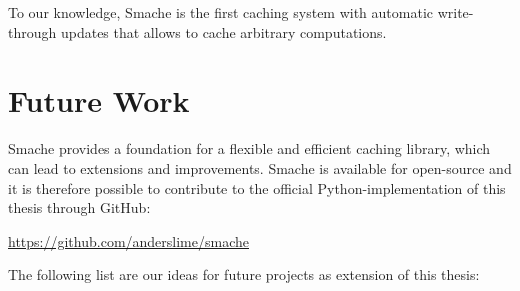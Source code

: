 To our knowledge, Smache is the first caching system with automatic write-through updates that allows to cache arbitrary computations.

\section{Future Work}
\label{sec:future_work}

Smache provides a foundation for a flexible and efficient caching library, which can lead to extensions and improvements. Smache is available for open-source and it is therefore possible to contribute to the official Python-implementation of this thesis through GitHub:

\url{https://github.com/anderslime/smache}

The following list are our ideas for future projects as extension of this thesis:


